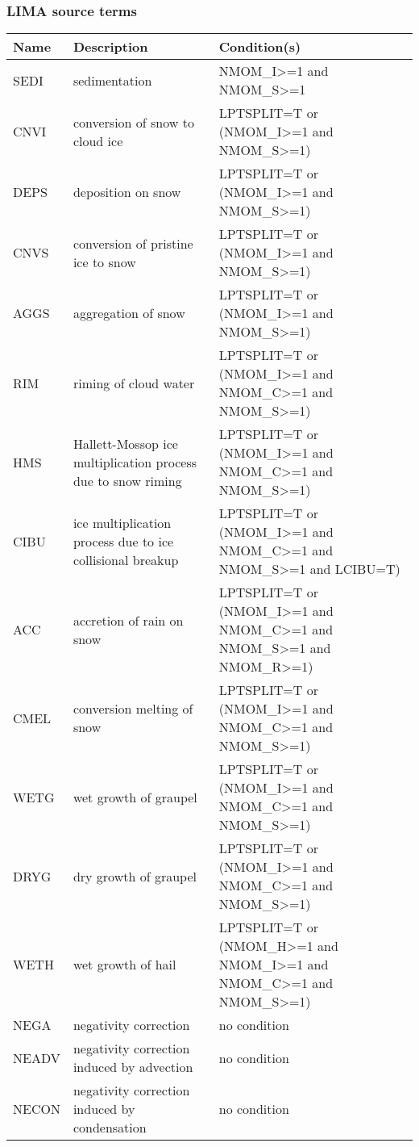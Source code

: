 \subsubsection{LIMA source terms}

\begin{longtable} {|p{}|p{}|p{}|}
\hline
Name & Description & Condition(s) \\
\hline \hline
\endhead
SEDI   & sedimentation                                 & NMOM\_I>=1 and NMOM\_S>=1 \\\hline
CNVI   & conversion of snow to cloud ice               & LPTSPLIT=T or (NMOM\_I>=1 and NMOM\_S>=1) \\\hline
DEPS   & deposition on snow                            & LPTSPLIT=T or (NMOM\_I>=1 and NMOM\_S>=1) \\\hline
CNVS   & conversion of pristine ice to snow            & LPTSPLIT=T or (NMOM\_I>=1 and NMOM\_S>=1) \\\hline
AGGS   & aggregation of snow                           & LPTSPLIT=T or (NMOM\_I>=1 and NMOM\_S>=1) \\\hline
RIM    & riming of cloud water                         & LPTSPLIT=T or (NMOM\_I>=1 and NMOM\_C>=1 and NMOM\_S>=1) \\\hline
HMS    & Hallett-Mossop ice multiplication process due to snow riming    & LPTSPLIT=T or (NMOM\_I>=1 and NMOM\_C>=1 and NMOM\_S>=1) \\\hline
CIBU   & ice multiplication process due to ice collisional breakup & LPTSPLIT=T or (NMOM\_I>=1 and NMOM\_C>=1 and NMOM\_S>=1 and LCIBU=T) \\\hline
ACC    & accretion of rain on snow                     & LPTSPLIT=T or (NMOM\_I>=1 and NMOM\_C>=1 and NMOM\_S>=1 and NMOM\_R>=1) \\\hline
CMEL   & conversion melting of snow                    & LPTSPLIT=T or (NMOM\_I>=1 and NMOM\_C>=1 and NMOM\_S>=1) \\\hline
WETG   & wet growth of graupel                         & LPTSPLIT=T or (NMOM\_I>=1 and NMOM\_C>=1 and NMOM\_S>=1) \\\hline
DRYG   & dry growth of graupel                         & LPTSPLIT=T or (NMOM\_I>=1 and NMOM\_C>=1 and NMOM\_S>=1) \\\hline
WETH   & wet growth of hail                            & LPTSPLIT=T or (NMOM\_H>=1 and NMOM\_I>=1 and NMOM\_C>=1 and NMOM\_S>=1) \\\hline
NEGA   & negativity correction                         & no condition \\\hline
NEADV  & negativity correction induced by advection    & no condition \\\hline
NECON  & negativity correction induced by condensation & no condition \\\hline
\end{longtable}

